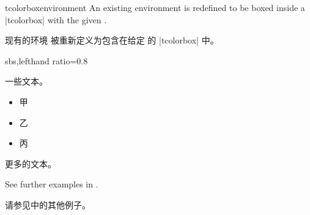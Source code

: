 
\begin{docCommand}[doc new=2014-10-20]{tcolorboxenvironment}{}
An existing environment  is redefined to be boxed inside a
|tcolorbox| with the given .


现有的环境  被重新定义为包含在给定  的 |tcolorbox| 中。
\begin{dispExample*}{sbs,lefthand ratio=0.8}
\newenvironment{myitemize}{%
\begin{itemize}}{\end{itemize}}


一些文本。
\begin{myitemize}
\item 甲
\item 乙
\item 丙
\end{myitemize}
更多的文本。
\end{dispExample*}

\medskip
See further examples in .

请参见中的其他例子。
\end{docCommand}

